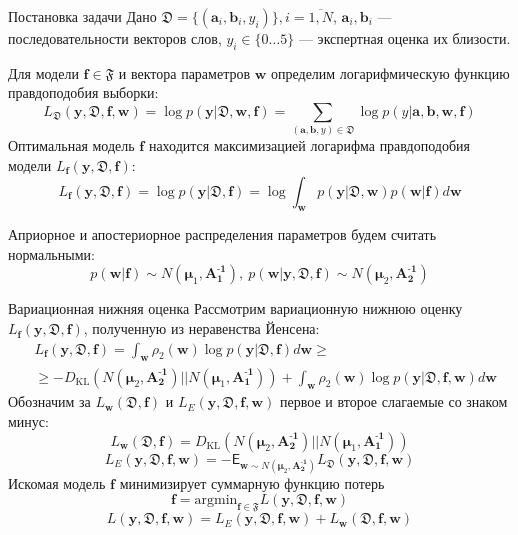 \documentclass{beamer}
\newcommand{\PP}{p}
\newcommand{\DD}{{\mathfrak{D}}}
\newcommand{\FFF}{{\mathfrak{F}}}
\newcommand{\bw}{{\textbf{w}}}
\newcommand{\ba}{{\textbf{a}}}
\newcommand{\bb}{{\textbf{b}}}
\newcommand{\bbf}{{\textbf{f}}}
\newcommand{\by}{{\textbf{y}}}
\newcommand{\bAo}{\mathbf{A^\text{-1}_\text{1}}}
\newcommand{\bAt}{\mathbf{A^\text{-1}_\text{2}}}
\newcommand{\bmuo}{{\boldsymbol{\mu}_1}}
\newcommand{\bmut}{{\boldsymbol{\mu}_2}}
\newcommand{\DKL}{\mathit{D}_{\text{KL}}}
\begin{document}
\begin{frame}{Постановка задачи}
Дано $\DD = \{(\ba_i,\bb_i,y_i)\}, i = \overline{1,N}$,
$\ba_i, \bb_i$ --- последовательности векторов слов, $y_i \in \{0\dots5\}$ --- экспертная оценка их близости. 

Для модели $\bbf \in \FFF$ и вектора параметров $\bw$ определим логарифмическую функцию правдоподобия выборки:
$$L_\DD(\by,\DD, \bbf,\bw) = \log\PP(\by|\DD,\bw,\bbf) = \sum_{(\ba,\bb,y)\in\DD} \log\PP(y|\ba,\bb,\bw,\bbf)$$
Оптимальная модель $\bbf$ находится максимизацией логарифма правдоподобия модели $L_\bbf(\by,\DD,\bbf)$:
$$L_\bbf(\by,\DD,\bbf) = \log \PP(\by|\DD,\bbf) = \log \int_{\bw}\PP(\by|\DD,\bw)\PP(\bw|\bbf)d\bw$$

Априорное и апостериорное распределения параметров будем считать нормальными:
$$\PP(\bw|\bbf) \sim N(\bmuo,\bAo), \ \PP(\bw|\by,\DD,\bbf) \sim N(\bmut,\bAt)$$

\end{frame}

\begin{frame}{Вариационная нижняя оценка}
Рассмотрим вариационную нижнюю оценку $L_\bbf(\by,\DD,\bbf)$, полученную из неравенства Йенсена:
\begin{align*}
&L_\bbf(\by,\DD,\bbf)= \int_{\bw}\rho_2(\bw)\log\PP(\by|\DD,\bbf)d\bw \geq\\&\geq-\DKL(N(\bmut,\bAt)||N(\bmuo,\bAo))+ \int_{\bw}\rho_2(\bw)\log\PP(\by|\DD,\bbf,\bw)d\bw
\end{align*}
Обозначим за $L_\bw(\DD,\bbf)$ и $L_E(\by,\DD,\bbf,\bw)$ первое и второе слагаемые со знаком минус:
$$L_\bw(\DD,\bbf) = \DKL(N(\bmut,\bAt)||N(\bmuo,\bAo))$$
$$L_E(\by,\DD,\bbf,\bw) = -\mathsf{E}_{\bw\sim N(\bmut,\bAt)}L_\DD(\by,\DD, \bbf,\bw)$$
Искомая модель $\bbf$ минимизирует суммарную функцию потерь
$$\bbf = \text{argmin}_{\bbf \in \FFF}L(\by,\DD,\bbf,\bw)$$%
$$L(\by,\DD,\bbf,\bw) = L_E(\by,\DD,\bbf,\bw) + L_\bw(\DD,\bbf,\bw)$$

\end{frame}
\end{document}

